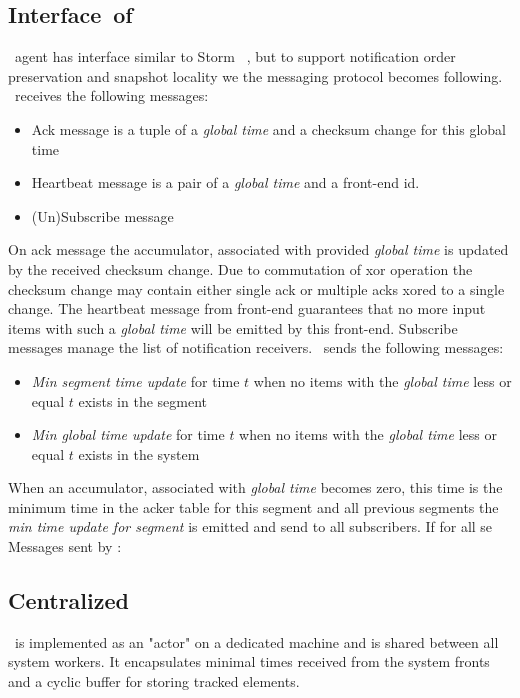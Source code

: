 \subsection{Interface\ of\ \tracker\ }
\tracker\ agent has interface similar to Storm \acker\ , but to support notification order preservation and snapshot locality we the messaging protocol becomes following. \tracker\ receives the following messages:
\begin{itemize}
	\item Ack message is a tuple of a \textit{global time} and a checksum change for this global time
	\item Heartbeat message is a pair of a \textit{global time} and a front-end id.
	\item (Un)Subscribe message
\end{itemize}
On ack message the accumulator, associated with provided \textit{global time} is updated by the received checksum change. Due to commutation of xor operation the checksum change may contain either single ack or multiple acks xored to a single change. The heartbeat message from front-end guarantees that no more input items with such a \textit{global time} will be emitted by this front-end. Subscribe messages manage the list of notification receivers. \tracker\ sends the following messages:
\begin{itemize}
    \item \textit{Min segment time update} for time $t$ when no items with the \textit{global time} less or equal $t$ exists in the segment
	\item \textit{Min global time update} for time $t$ when no items with the \textit{global time} less or equal $t$ exists in the system
\end{itemize}
When an accumulator, associated with \textit{global time} becomes zero, this time is the minimum time in the acker table for this segment and all previous segments the \textit{min time update for segment} is emitted and send to all subscribers. If for all se
Messages sent by \tracker:


\subsection{Centralized \tracker\ }

\tracker\ is implemented as an "actor" on a dedicated machine and is shared between all system workers. It encapsulates minimal times received from the system fronts and a cyclic buffer for storing tracked elements.

